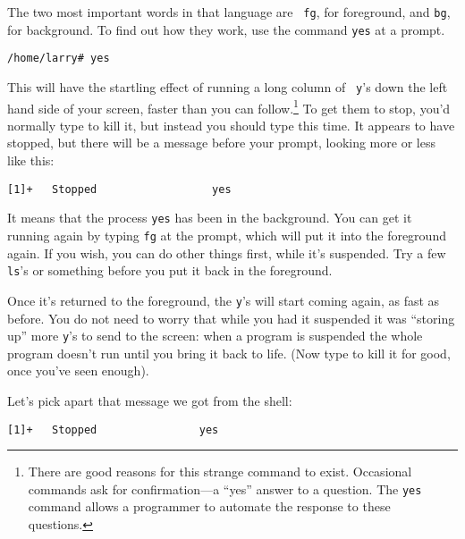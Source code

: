         The two most important words in that language are {\tt
fg}, for foreground, and {\tt bg}, for
background.  To find out how they work, use the command 
{\tt yes} at a prompt.

\begin{screen}\begin{verbatim}
/home/larry# yes
\end{verbatim}
\end{screen}

This will have the startling effect of running a long column of {\tt
  y}'s down the left hand side of your screen, faster than you can
follow.\footnote{There are good reasons for this strange command to
  exist.  Occasional commands ask for confirmation---a ``yes'' answer
  to a question.  The {\tt yes} command allows a programmer to
  automate the response to these questions.} To get them to stop,
you'd normally type  to kill it, but instead you should
type  this time.  It appears to have stopped, but there
will be a message before your prompt, looking more or less like this:

\begin{screen}\begin{verbatim}
[1]+   Stopped                  yes
\end{verbatim}
\end{screen}

It means that the process {\tt yes} has been  in
the background.  You can get it running again by typing 
 {\tt fg} at the prompt, which will put it into the
foreground again.  If you wish, you can do other things first, while
it's suspended.  Try a few {\tt ls}'s or something before you put it
back in the foreground.

        Once it's returned to the foreground, the {\tt y}'s will start
coming again, as fast as before.  You do not need to worry that while
you had it suspended it was ``storing up'' more {\tt y}'s to send to the
screen: when a program is suspended the whole program doesn't run
until you bring it back to life.  (Now type  to
kill it for good, once you've seen enough).

        Let's pick apart that message we got from the shell:

\begin{screen}\begin{verbatim}
[1]+   Stopped                yes
\end{verbatim}\end{screen}

